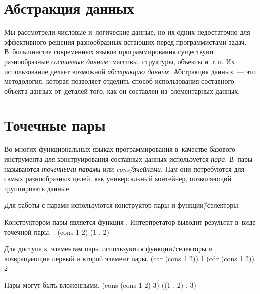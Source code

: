 \label{Less:lists}

\section[2]{Абстракция данных}%
Мы рассмотрели числовые и~логические данные, но их одних недостаточно для эффективного решения разнообразных встающих перед программистами задач. В~большинстве современных языков программирования существуют разнообразные \emph{составные данные}: массивы, структуры, объекты и~т.\,п. Их использование делает возможной \emph{абстракцию данных}. Абстракция данных~--- это методология, которая позволяет отделить способ использования составного объекта данных от~деталей того, как он составлен из~элементарных данных.


\section[2]{Точечные пары}\label{pair}%
Во многих функциональных языках программирования в~качестве базового инструмента для конструирования составных данных используется \emph{пара}. В~\Scheme пары называются \emph{точечными парами} или \emph{cons\=/ячейками}. Нам они потребуются для самых разнообразных целей, как универсальный контейнер, позволяющий группировать данные.

Для работы с парами используются конструктор пары и функции\=/селекторы.

\begin{example}{%
Конструктором пары является функция . Интерпретатор выводит результат в~виде точечной пары: .}
\REPL
  {(cons 1 2)}
  {(1 . 2)}
\end{example}

\vspace{-\medskipamount}
\begin{example}{%
Для доступа к~элементам пары используются функции\=/селекторы  и , возвращающие первый и второй элемент пары.}
\REPL
  {(car (cons 1 2))}
  {1}
\REPL
  {(cdr (cons 1 2))}
  {2}
\end{example}

\vspace{-\medskipamount}
\begin{example}{%
Пары могут быть вложенными.}
\REPL
  {(cons (cons 1 2) 3)}
  {((1 . 2) . 3)}
\end{example}

